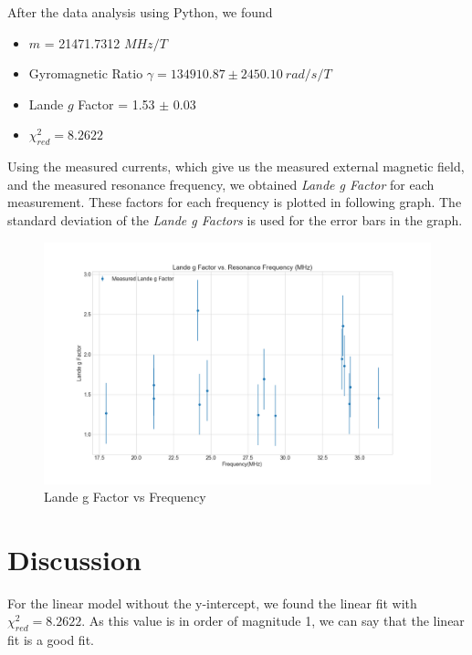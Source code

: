 \documentclass[letterpaper,12pt]{article}
\begin{document}
After the data analysis using Python, we found 
\begin{itemize}
  \item[] $m$ = 21471.7312 $MHz / T$
  \item[] Gyromagnetic Ratio $\gamma = 134910.87 \pm 2450.10\ rad/s/T$
  \item[] Lande $g$ Factor = 1.53 $\pm$ 0.03
  \item[] $\chi_{red}^2 = 8.2622$ 
\end{itemize}

Using the measured currents, which give us the measured external magnetic field, 
and the measured resonance frequency, we obtained \emph{Lande g Factor} for each measurement.
These factors for each frequency is plotted in following graph. The standard deviation
of the \emph{Lande g Factors} is used for the error bars in the graph.

\begin{figure}[H]
  \centering
  \includegraphics[width=1.0\linewidth]{../code/Pankaj/lab6_g_factor_vs_freq.png}    
  \begin{center}
    \begin{center}   
    \end{center}  \end{center}
  \caption{Lande g Factor vs Frequency}
  \label{lande-vs-frq}
\end{figure}

\section{Discussion}

For the linear model without the y-intercept, we found the linear fit with $\chi_{red}^2 = 8.2622$. As this value 
is in order of magnitude 1, we can say that the linear fit is a good fit. 
\end{document}
